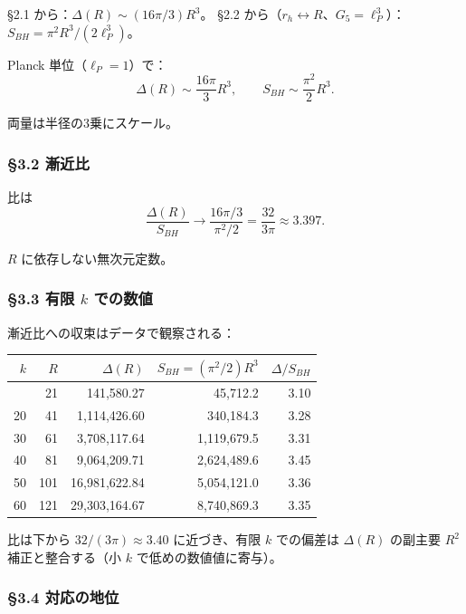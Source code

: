 \documentclass[a4paper,11pt]{ltjsarticle}
\theoremstyle{definition}
\begin{document}
§2.1 から：\(\Delta(R) \sim (16\pi/3) R^3\)。 §2.2
から（\(r_h \leftrightarrow R\)、\(G_5 = \ell_P^3\)）：\(S_{BH} = \pi^2 R^3 / (2 \ell_P^3)\)。

Planck 単位（\(\ell_P = 1\)）で：
\[\Delta(R) \sim \frac{16\pi}{3} R^3, \qquad S_{BH} \sim \frac{\pi^2}{2} R^3.\]

両量は半径の3乗にスケール。

\subsubsection{§3.2 漸近比}\label{ux6f38ux8fd1ux6bd4}

比は
\[\frac{\Delta(R)}{S_{BH}} \to \frac{16\pi/3}{\pi^2/2} = \frac{32}{3\pi} \approx 3.397.\]

\(R\) に依存しない無次元定数。

\subsubsection{\texorpdfstring{§3.3 有限 \(k\)
での数値}{§3.3 有限 k での数値}}\label{ux6709ux9650-k-ux3067ux306eux6570ux5024}

漸近比への収束はデータで観察される：

{\def\LTcaptype{none} %
\begin{longtable}[]{@{}rrrrr@{}}
\toprule\noalign{}
\(k\) & \(R\) & \(\Delta(R)\) & \(S_{BH} = (\pi^2/2) R^3\) &
\(\Delta/S_{BH}\) \\
\midrule\noalign{}
\endhead
\bottomrule\noalign{}
\endlastfoot
10 & 21 & 141,580.27 & 45,712.2 & 3.10 \\
20 & 41 & 1,114,426.60 & 340,184.3 & 3.28 \\
30 & 61 & 3,708,117.64 & 1,119,679.5 & 3.31 \\
40 & 81 & 9,064,209.71 & 2,624,489.6 & 3.45 \\
50 & 101 & 16,981,622.84 & 5,054,121.0 & 3.36 \\
60 & 121 & 29,303,164.67 & 8,740,869.3 & 3.35 \\
\end{longtable}
}

比は下から \(32/(3\pi) \approx 3.40\) に近づき、有限 \(k\) での偏差は
\(\Delta(R)\) の副主要 \(R^2\) 補正と整合する（小 \(k\)
で低めの数値値に寄与）。

\subsubsection{§3.4 対応の地位}\label{ux5bfeux5fdcux306eux5730ux4f4d}
\end{document}
